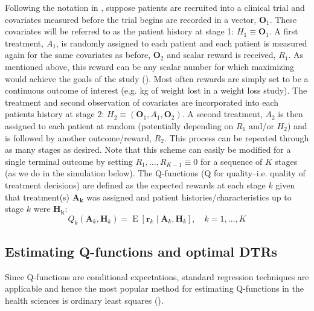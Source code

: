 \documentclass[12pt]{article}
\begin{document}
Following the notation in \textcite{dtr-book}, suppose patients are recruited into a clinical trial and covariates measured before the trial begins are recorded in a vector, $\bm{\bm{O}}_{1}$. These covariates will be referred to as the patient history at stage 1: $H_{1} \equiv \bm{O}_{1}$. A first treatment, $A_{1}$, is randomly assigned to each patient and each patient is measured again for the same covariates as before, $\bm{O}_{2}$ and scalar reward is received, $R_{1}$. As mentioned above, this reward can be any scalar number for which maximizing would achieve the goals of the study (\cite{Sutton2016}). Most often rewards are simply set to be a continuous outcome of interest (e.g. kg of weight lost in a weight loss study). The treatment and second observation of covariates are incorporated into each patients history at stage 2: $H_{2} \equiv (\bm{O}_{1}, A_{1}, \bm{O}_{2})$. A second treatment, $A_{2}$ is then assigned to each patient at random (potentially depending on $R_{1}$ and/or $H_{2}$) and is followed by another outcome/reward, $R_{2}$. This process can be repeated through as many stages as desired. Note that this scheme can easily be modified for a single terminal outcome by setting $R_{1}, \ldots, R_{K-1} \equiv 0$ for a sequence of $K$ stages (as we do in the simulation below). The Q-functions (Q for quality--i.e. quality of treatment decisions) are defined as the expected rewards at each stage $k$ given that treatment(s) $\bm{A_{k}}$ was assigned and patient histories/characteristics up to stage $k$ were $\bm{H_{k}}$:
\begin{equation}
   Q_{k}(\bm{A}_{k}, \bm{H}_{k})  = \operatorname{E}[\bm{r}_{k} \mid \bm{A}_{k}, \bm{H}_{k}], \quad k = 1, \ldots, K
\end{equation}

%
%
%

\subsection{Estimating Q-functions and optimal DTRs} %
\label{sub:estimating_q_functions}

Since Q-functions are conditional expectations, standard regression techniques are applicable and hence the most popular method for estimating Q-functions in the health sciences is ordinary least squares (\cite{dtr-review}).
\end{document}
